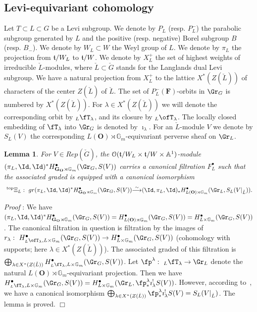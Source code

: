 \documentclass[11pt]{amsart}
\newtheorem{lem}{Lemma}
\theoremstyle{definition}
\theoremstyle{remark}
\renewcommand{\O}{{\mathcal O}}
\theoremstyle{remark}
\newcommand{\cal}{\mathcal}
\newcommand{\iso}{{\stackrel{\sim}{\longrightarrow}}}
\newcommand{\<}{\langle}
\renewcommand{\>}{\rangle}
\renewcommand{\t}{{\frak t}}
\newcommand{\LG}{{\check{G}}}
\newcommand{\LL}{\check{L}{}}
\renewcommand{\O}{{\cal O}}
\newcommand{\GO}{{\bf G_O}}
\newcommand{\Aone}{{\mathbb A}^1}
\newcommand{\Gm}{{{\mathbb G}_m}}
\renewcommand{\proof}{{\it Proof }}
\begin{document}
\subsection{Levi-equivariant cohomology}
\label{levi}
Let $T\subset L\subset G$ be a Levi subgroup. We denote by $P_L$ (resp.
$P^-_L$) the parabolic subgroup generated by $L$ and the positive (resp.
negative) Borel subgroup $B$ (resp. $B_-$). We denote by $W_L\subset W$ 
the Weyl group of $L$. We denote by $\pi_L$ the projection from 
$\t/W_L$ to $\t/W$. We denote by $X^+_L$ the set of highest weights of
irreducible $\LL$-modules, where $\LL\subset\LG$ stands for the Langlands
dual Levi subgroup. We have a natural projection from $X^+_L$ to the lattice
$X^*(Z(\LL))$ of characters of the center $Z(\LL)$ of $\LL$.
The set of $P^-_L({\mathbf F})$-orbits in $\Gr_G$ is numbered by
$X^*(Z(\LL))$. For $\lambda\in X^*(Z(\LL))$ we will denote the corresponding
orbit by $_L\fT_\lambda$, and its closure by $_L\ofT_\lambda$.
The locally closed embedding of $\fT_\lambda$ into $\Gr_G$ is 
denoted by $\imath_\lambda$.
For an $\LL$-module $V$ we denote by $S_L(V)$ the corresponding
$L({\mathbf O})\rtimes\Gm$-equivariant perverse sheaf on $\Gr_L$.

\begin{lem}
\label{Chicago}
For $V\in Rep(\LG)$, the $\O(\t/W_L\times\t/W\times\Aone)$-module
$(\pi_L,\Id,\Id)^*H^\bullet_{\GO\rtimes\Gm}(\Gr_G,S(V))$
carries a canonical filtration $F^\bullet_L$ such that the associated graded is
equipped with a canonical isomorphism
$$\ ^{\operatorname{top}}\Xi_L:\ gr(\pi_L,\Id,\Id)^*H^\bullet_{\GO\rtimes\Gm}(\Gr_G,S(V))
\iso(\Id,\pi_L,\Id)_*
H^\bullet_{L({\mathbf O})\rtimes\Gm}(\Gr_L,S_L(V|_{\LL})).$$
\end{lem}

\proof: We have 
$(\pi_L,\Id,\Id)^*H^\bullet_{\GO\rtimes\Gm}(\Gr_G,S(V))=
H^\bullet_{L({\mathbf O})\rtimes\Gm}(\Gr_G,S(V))=H^\bullet_{L\times\Gm}
(\Gr_G,S(V))$.
The canonical filtration in question is filtration by the images of
$r_\lambda:\ H^\bullet_{_L\ofT_\lambda,L\times\Gm}(\Gr_G,S(V))\to
H^\bullet_{L\times\Gm}(\Gr_G,S(V))$ (cohomology with supports; here
$\lambda\in X^*(Z(\LL))$). The associated graded of this filtration is
$\bigoplus_{\lambda\in X^*(Z(\LL))}H^\bullet_{_L\fT_\lambda,L\times\Gm}
(\Gr_G,S(V))$. Let $\fp^\lambda:\ _L\fT_\lambda\to\Gr_L$ denote the
natural $L({\mathbf O})\rtimes\Gm$-equivariant projection. Then we have
$H^\bullet_{_L\fT_\lambda,L\times\Gm}(\Gr_G,S(V))=
H^\bullet_{L\times\Gm}(\Gr_L,\fp^\lambda_*\imath_\lambda^!S(V))$.
However, according to~\cite{BD}, we have a canonical isomorphism
$\bigoplus_{\lambda\in X^*(Z(\LL))}\fp^\lambda_*\imath_\lambda^!S(V)=
S_L(V|_{\LL})$. The lemma is proved.
\hfill $\Box$
\end{document}
